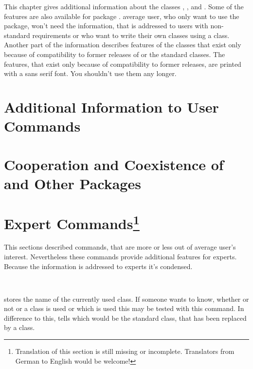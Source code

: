 This chapter gives additional information about the \KOMAScript{} classes
, , and . Some of the features
are also available for package .  average user, who only
want to use the package, won't need the information, that is addressed to
users with non-standard requirements or who want to write their own classes
using a \KOMAScript{} class. Another part of the information describes features
of the classes that exist only because of compatibility to former
releases of \KOMAScript{} or the standard classes. The features, that exist
only because of compatibility to former \KOMAScript{} releases, are printed
with a sans serif font. You shouldn't use them any longer.


\section{Additional Information to User Commands}
\label{sec:maincls-experts.addInfos}



\section{Cooperation and Coexistence of \KOMAScript{} and Other Packages}
\label{sec:maincls-experts.coexistence}



\section{Expert Commands\protect\footnote{Translation of this section is
    still missing or incomplete. Translators from German to English would be
    welcome!}}
\label{sec:maincls-experts.experts}

This sections described commands, that are more or less out of average user's
interest. Nevertheless these commands provide additional features for
experts. Because the information is addressed to experts it's condensed.


\begin{Declaration}
  \\
\end{Declaration}
%
%
 stores the name of the currently used \KOMAScript{}
class. If someone wants to know, whether or not or a \KOMAScript{} class is
used or which \KOMAScript{} is used this may be tested with this command. In
difference to this,  tells which would be the standard class,
that has been replaced by a \KOMAScript{} class.

